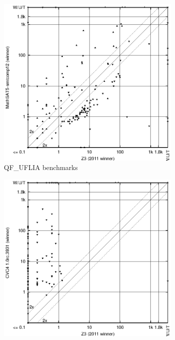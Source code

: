 \documentclass{llncs}
\begin{document}
\begin{figure}[ht]
\begin{subfigure}{0.45\textwidth}
	\end{subfigure}
\begin{subfigure}{0.45\textwidth}
	   \includegraphics[width=1\textwidth]{QF_UFLIA-scatter-improvement.eps}
	   \caption{QF\_UFLIA benchmarks}
	\end{subfigure}	
\begin{subfigure}{0.45\textwidth}
	   \includegraphics[width=1\textwidth]{AUFLIA+p-scatter-improvement.eps}

\end{subfigure}
\end{figure}
\end{document}
